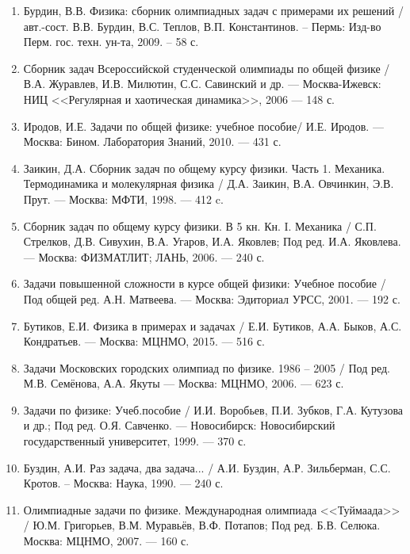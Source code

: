 \begin{enumerate}

\item Бурдин, В.В. Физика: сборник олимпиадных задач с примерами их решений  /  авт.-сост. В.В. Бурдин, В.С. Теплов, В.П. Константинов. – Пермь: Изд-во Перм. гос. техн. ун-та, 2009. – 58 с.

\item Сборник задач Всероссийской студенческой олимпиады по общей физике / В.А. Журавлев, И.В. Милютин, С.С. Савинский и др. — Москва-Ижевск: НИЦ <<Регулярная и хаотическая динамика>>, 2006 — 148 с.

\item Иродов, И.Е. Задачи по общей физике: учебное пособие/ И.Е. Иродов. — Москва: Бином. Лаборатория Знаний, 2010. — 431 с.

\item Заикин, Д.А. Сборник задач по общему курсу физики. Часть 1. Механика. Термодинамика и молекулярная физика / Д.А. Заикин, В.А. Овчинкин, Э.В. Прут. — Москва: МФТИ, 1998. — 412 c.

\item Сборник задач по общему курсу физики. В 5 кн. Кн. I. Механика /
С.П. Стрелков, Д.В. Сивухин, В.А. Угаров, И.А. Яковлев; Под ред. И.А. Яковлева. — Москва: ФИЗМАТЛИТ; ЛАНЬ, 2006. — 240 с.

\item Задачи повышенной сложности в курсе общей физики: Учебное пособие / Под общей ред. А.Н. Матвеева. — Москва: Эдиториал УРСС, 2001. — 192 с.

\item Бутиков, Е.И. Физика в примерах и задачах / Е.И. Бутиков, А.А. Быков, А.С. Кондратьев. — Москва:  МЦНМО, 2015. — 516 с.

\item Задачи Московских городских олимпиад по физике. 1986 – 2005 / Под ред. М.В. Семёнова, А.А. Якуты — Москва: МЦНМО, 2006. — 623 с.

\item Задачи по физике: Учеб.пособие / И.И. Воробьев, П.И. Зубков, Г.А. Кутузова и др.; Под ред. О.Я. Савченко. — Новосибирск: Новосибирский государственный университет, 1999. — 370 с.

\item Буздин, А.И. Раз задача, два задача... / А.И. Буздин, А.Р. Зильберман, С.С. Кротов. – Москва: Наука, 1990. — 240 с.

\item Олимпиадные задачи по физике. Международная олимпиада <<Туймаада>> / Ю.М. Григорьев, В.М. Муравьёв, В.Ф. Потапов; Под ред. Б.В. Селюка. Москва: МЦНМО, 2007. — 160 с.

\end{enumerate}